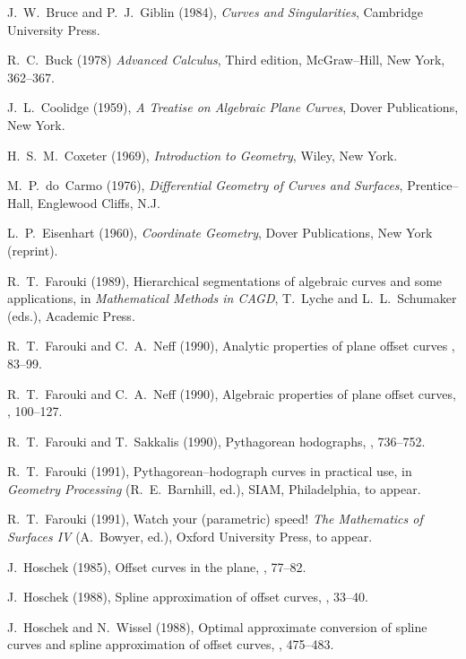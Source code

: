 \begin{thebibliography}{99}

J.~W.~Bruce and P.~J.~Giblin (1984), {\it Curves and Singularities},
Cambridge University Press.

R.~C.~Buck (1978) {\it Advanced Calculus}, Third edition, McGraw--Hill,
New York, 362--367.

J.~L.~Coolidge (1959), {\it A Treatise on Algebraic Plane Curves},
Dover Publications, New York.

H.~S.~M.~Coxeter (1969), {\it Introduction to Geometry}, Wiley,
New York.

M.~P.~do~Carmo (1976), {\it Differential Geometry of Curves and
Surfaces}, Prentice--Hall, Englewood Cliffs, N.J.

L.~P.~Eisenhart (1960), {\it Coordinate Geometry}, Dover Publications,
New York (reprint).

R.~T.~Farouki (1989), Hierarchical segmentations of algebraic curves
and some applications, in {\it Mathematical Methods in CAGD}, T.~Lyche
and L.~L.~Schumaker (eds.), Academic Press.

R.~T.~Farouki and C.~A.~Neff (1990), Analytic properties of plane
offset curves , 83--99.

R.~T.~Farouki and C.~A.~Neff (1990), Algebraic properties of plane
offset curves, , 100--127.

R.~T.~Farouki and T.~Sakkalis (1990), Pythagorean hodographs,
, 736--752.

R.~T.~Farouki (1991), Pythagorean--hodograph curves in practical
use, in {\it Geometry Processing\/} (R.~E.~Barnhill, ed.), SIAM,
Philadelphia, to appear.

R.~T.~Farouki (1991), Watch your (parametric) speed! {\it The
Mathematics of Surfaces IV\/} (A.~Bowyer, ed.), Oxford University
Press, to appear.

J.~Hoschek (1985), Offset curves in the plane, , 77--82.

J.~Hoschek (1988), Spline approximation of offset curves, ,
33--40.

J.~Hoschek and N.~Wissel (1988), Optimal approximate conversion of
spline curves and spline approximation of offset curves, ,
475--483.


\end{thebibliography}
